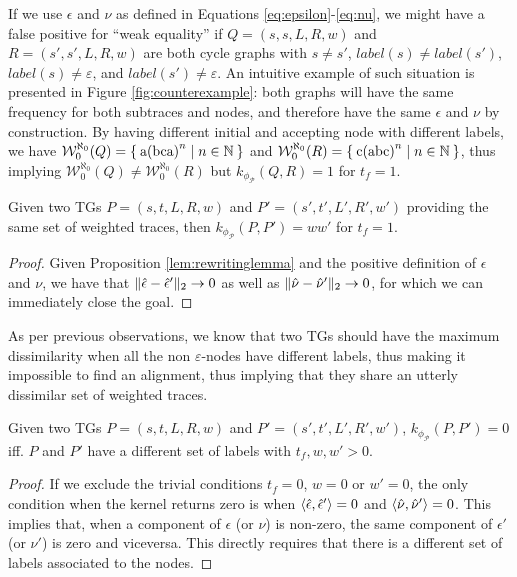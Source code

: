 \begin{example}
	If we use $\epsilon$ and $\nu$ as defined in Equations \ref{eq:epsilon}-\ref{eq:nu}, we might have a false positive for ``weak equality'' if $Q=(s,s,L,R,w)$ and $R=(s',s',L,R,w)$ are both cycle graphs with $s\neq s'$, $\textit{label}(s)\neq\textit{label}(s')$, $\textit{label}(s)\neq\varepsilon$, and $\textit{label}(s')\neq\varepsilon$. An intuitive example of such situation is presented in Figure \ref{fig:counterexample}: both graphs will have the same frequency for both subtraces and nodes, and therefore have the same  $\epsilon$ and $\nu$ by construction. By having different initial and accepting node with  different labels, we have $\mathcal{W}_0^{\aleph_0}(Q)=\Set{\textup{a(bca)}^n|n\in\mathbb{N}}$ and $\mathcal{W}_0^{\aleph_0}(R)=\Set{\textup{c(abc)}^n|n\in\mathbb{N}}$, thus implying $\mathcal{W}_0^{\aleph_0}(Q)\neq\mathcal{W}_0^{\aleph_0}(R)$ but $k_{\phi_{\mathcal{P}}}(Q,R)=1$ for $t_f=1$.
\end{example}


\begin{lemma}
Given two TGs $P=(s,t,L,R,w)$ and $P'=(s',t',L',R',w')$ providing the same set of weighted traces, then $k_{\phi_{\mathcal{P}}}(P,P')=ww'$ for $t_f=1$.
\end{lemma}
\begin{proof}
Given Proposition \ref{lem:rewritinglemma} and the positive definition of $\epsilon$ and $\nu$,  we have that $\|\hat{\epsilon}-\hat{\epsilon}'\|_{2}\to 0$ as well as $\|\hat{\nu}-\hat{\nu}'\|_{2}\to 0$, for which we can immediately close the goal.
\end{proof}

As per previous observations, we know that two TGs should have the maximum dissimilarity when all the non $\varepsilon$-nodes have different labels, thus making it impossible to find an alignment, thus implying that they share an utterly dissimilar set of weighted traces.

\begin{lemma}
Given two TGs $P=(s,t,L,R,w)$ and $P'=(s',t',L',R',w')$, $k_{\phi_{\mathcal{P}}}(P,P')=0$ iff. $P$ and $P'$ have a different set of labels with $t_f,w,w'>0$.
\end{lemma}
\begin{proof}
If we exclude the trivial conditions $t_f=0$, $w=0$ or $w'=0$, the only condition when the kernel returns zero is when  $\Braket{\hat{\epsilon},\hat{\epsilon}'}=0$ and $\Braket{\hat{\nu},\hat{\nu}'}=0$. This implies that, when a component of $\epsilon$ (or $\nu$) is non-zero, the same component of $\epsilon'$ (or $\nu'$) is zero and viceversa. This directly requires that there is a different set of labels associated to the nodes. 
\end{proof}

